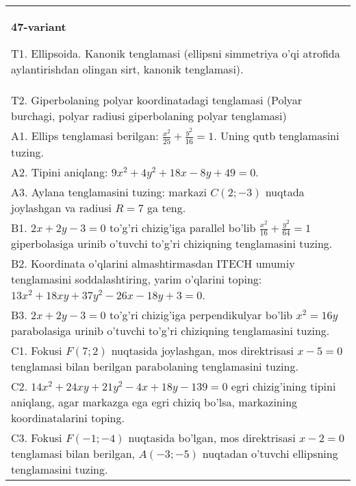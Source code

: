 \documentclass{article}
\begin{document}
\begin{tabular}{m{17cm}}
\textbf{47-variant}
\newline

T1. Ellipsoida. Kanonik tenglamasi (ellipsni simmetriya o'qi atrofida aylantirishdan olingan sirt, kanonik tenglamasi).\\

T2. Giperbolaning polyar koordinatadagi tenglamasi (Polyar burchagi, polyar radiusi giperbolaning polyar tenglamasi)\\

A1. Ellips tenglamasi berilgan: $\frac{x^2}{25}+\frac{y^2}{16}=1$. Uning qutb tenglamasini tuzing.\\

A2. Tipini aniqlang: $9x^{2}+4y^{2}+18x-8y+49=0$.\\

A3. Aylana tenglamasini tuzing: markazi $C(2;-3)$ nuqtada joylashgan va radiusi $R=7$ ga teng.\\

B1. $2x + 2y - 3 = 0$ to'g'ri chizig'iga parallel bo'lib $\frac{x^{2}}{16} + \frac{y^{2}}{64} = 1$ giperbolasiga urinib o'tuvchi to'g'ri chiziqning tenglamasini tuzing.  \\

B2. Koordinata o'qlarini almashtirmasdan ITECH umumiy tenglamasini soddalashtiring, yarim o'qlarini toping: $13x^{2} + 18xy + 37y^{2} - 26x - 18y + 3 = 0$.  \\

B3. $2x + 2y - 3 = 0$ to'g'ri chizig'iga perpendikulyar bo'lib $x^{2} = 16y$ parabolasiga urinib o'tuvchi to'g'ri chiziqning tenglamasini tuzing.  \\

C1. Fokusi $F(7;2)$ nuqtasida joylashgan, mos direktrisasi $x - 5 = 0$ tenglamasi bilan berilgan parabolaning tenglamasini tuzing.  \\

C2. $14x^{2} + 24xy + 21y^{2} - 4x + 18y - 139 = 0$ egri chizig'ining tipini aniqlang, agar markazga ega egri chiziq bo'lsa, markazining koordinatalarini toping.  \\

C3. Fokusi $F( - 1; - 4)$ nuqtasida bo'lgan, mos direktrisasi $x - 2 = 0$ tenglamasi bilan berilgan, $A( - 3; - 5)$ nuqtadan o'tuvchi ellipsning tenglamasini tuzing.  \\

\end{tabular}
\vspace{1cm}
\end{document}
